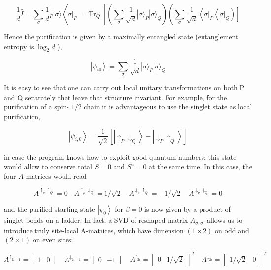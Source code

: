 \documentclass[12pt]{article}
\begin{document}
\begin{equation*}
\frac{1}{d} \hat{I}=\sum_{\sigma} \frac{1}{d}{ }_{P}|\sigma\rangle\left\langle\left.\sigma\right|_{P}=\operatorname{Tr}_{Q}\left[( \sum _ { \sigma } \frac { 1 } { \sqrt { d } } | \sigma \rangle _ { P } | \sigma \rangle _ { Q } ) \left(\sum_{\sigma} \frac{1}{\sqrt{d}}\left\langle\left.\sigma\right|_{P}\left\langle\left.\sigma\right|_{Q}\right)\right]\right.\right.\right. \tag{242}
\end{equation*}


Hence the purification is given by a maximally entangled state (entanglement entropy is $\log _{2} d$ ),


\begin{equation*}
\left|\psi_{i 0}\right\rangle=\sum_{\sigma} \frac{1}{\sqrt{d}}|\sigma\rangle_{P}|\sigma\rangle_{Q} \tag{243}
\end{equation*}


It is easy to see that one can carry out local unitary transformations on both $\mathrm{P}$ and $\mathrm{Q}$ separately that leave that structure invariant. For example, for the purification of a spin- $1 / 2$ chain it is advantageous to use the singlet state as local purification,


\begin{equation*}
\left|\psi_{i, 0}\right\rangle=\frac{1}{\sqrt{2}}\left[\left|\uparrow_{P} \downarrow_{Q}\right\rangle-\left|\downarrow_{P} \uparrow_{Q}\right\rangle\right] \tag{244}
\end{equation*}


in case the program knows how to exploit good quantum numbers: this state would allow to conserve total $S=0$ and $S^{z}=0$ at the same time. In this case, the four $A$-matrices would read


\begin{equation*}
A^{\uparrow_{p} \uparrow_{Q}}=0 \quad A^{\uparrow_{p} \downarrow_{Q}}=1 / \sqrt{2} \quad A^{\downarrow_{p} \uparrow_{Q}}=-1 / \sqrt{2} \quad A^{\downarrow_{p} \downarrow_{Q}}=0 \tag{245}
\end{equation*}


and the purified starting state $\left|\psi_{0}\right\rangle$ for $\beta=0$ is now given by a product of singlet bonds on a ladder. In fact, a SVD of reshaped matrix $A_{\sigma, \sigma^{\prime}}$ allows us to introduce truly site-local A-matrices, which have dimension $(1 \times 2)$ on odd and $(2 \times 1)$ on even sites:

\[
A^{\uparrow_{2 i-1}}=\left[\begin{array}{ll}
1 & 0
\end{array}\right] \quad A^{\downarrow_{2 i-1}}=\left[\begin{array}{ll}
0 & -1
\end{array}\right] \quad A^{\uparrow_{2 i}}=\left[\begin{array}{lll}
0 & 1 / \sqrt{2}
\end{array}\right]^{T} \quad A^{\downarrow_{2 i}}=\left[\begin{array}{lll}
1 / \sqrt{2} & 0 \tag{246}
\end{array}\right]^{T}
\]
\end{document}
